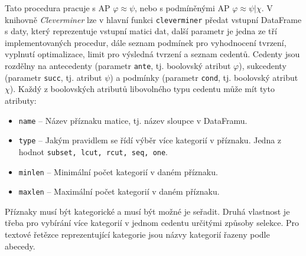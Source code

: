 Tato procedura pracuje s AP $\varphi \approx \psi$, nebo s podmíněnými AP $\varphi \approx \psi | \chi$. V knihovně \emph{Cleverminer} lze v hlavní funkci \texttt{cleverminer} předat vstupní DataFrame s daty, který reprezentuje vstupní matici dat, další parametr je jedna ze tří implementovaných procedur, dále seznam podmínek pro vyhodnocení tvrzení, vyplnutí optimalizace, limit pro výsledná tvrzení a seznam cedentů. Cedenty jsou rozdělny na antecedenty (parametr \texttt{ante}, tj. boolovský atribut $\varphi$), sukcedenty (parametr \texttt{succ}, tj. atribut $\psi$) a podmínky (parametr \texttt{cond}, tj. boolovský atribut $\chi$).
Každý z boolovských atributů libovolného typu cedentu může mít tyto atributy:
\begin{itemize}
    \itemsep0em
    \item \texttt{name} -- Název příznaku matice, tj. název sloupce v DataFramu.
    \item \texttt{type} -- Jakým pravidlem se řídí výběr více kategorií v příznaku. Jedna z hodnot \texttt{subset, lcut, rcut, seq, one}. 
    \item \texttt{minlen} -- Minimální počet kategorií v daném příznaku.
    \item \texttt{maxlen} -- Maximální počet kategorií v daném příznaku.\cite{bib:GUHAclever}
\end{itemize}

Příznaky musí být kategorické a musí být možné je seřadit. Druhá vlastnost je třeba pro vybírání více kategorií v jednom cedentu určitými způsoby selekce. Pro textové řetězce reprezentující kategorie jsou názvy kategorií řazeny podle abecedy.\cite{bib:GUHAclever}


